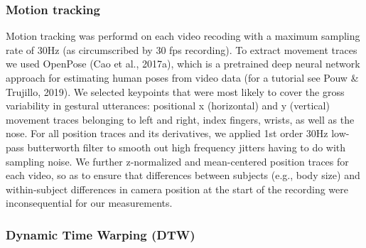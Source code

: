 \documentclass[
  man, noextraspace,floatsintext]{apa6}
\begin{document}
\hypertarget{motion-tracking}{%
\subsubsection{Motion tracking}\label{motion-tracking}}

Motion tracking was performd on each video recoding with a maximum sampling rate of 30Hz (as circumscribed by 30 fps recording). To extract movement traces we used OpenPose (Cao et al., 2017a), which is a pretrained deep neural network approach for estimating human poses from video data (for a tutorial see Pouw \& Trujillo, 2019). We selected keypoints that were most likely to cover the gross variability in gestural utterances: positional x (horizontal) and y (vertical) movement traces belonging to left and right, index fingers, wrists, as well as the nose. For all position traces and its derivatives, we applied 1st order 30Hz low-pass butterworth filter to smooth out high frequency jitters having to do with sampling noise. We further z-normalized and mean-centered position traces for each video, so as to ensure that differences between subjects (e.g., body size) and within-subject differences in camera position at the start of the recording were inconsequential for our measurements.

\hypertarget{dynamic-time-warping-dtw}{%
\subsubsection{Dynamic Time Warping (DTW)}\label{dynamic-time-warping-dtw}}
\end{document}
